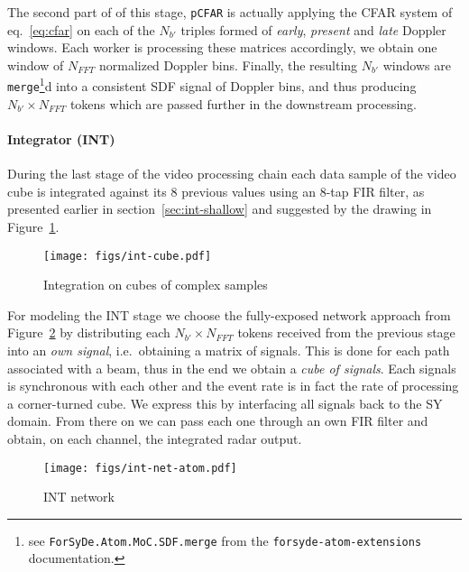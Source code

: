 \documentclass[
  a4paper,
]{article}
\let\oldparagraph\paragraph
\renewcommand{\paragraph}[1]{\oldparagraph{#1}\mbox{}}
\begin{document}
The second part of of this stage, \texttt{pCFAR} is actually applying
the CFAR system of eq.~\ref{eq:cfar} on each of the \(N_{b'}\) triples
formed of \emph{early}, \emph{present} and \emph{late} Doppler windows.
Each worker is processing these matrices accordingly, we obtain one
window of \(N_{FFT}\) normalized Doppler bins. Finally, the resulting
\(N_{b'}\) windows are \texttt{merge}\footnote{see
  \texttt{ForSyDe.Atom.MoC.SDF.merge} from the
  \texttt{forsyde-atom-extensions} documentation.}d into a consistent
SDF signal of Doppler bins, and thus producing \(N_{b'}\times N_{FFT}\)
tokens which are passed further in the downstream processing.

\hypertarget{integrator-int}{%
\paragraph{Integrator (INT)}\label{integrator-int}}

During the last stage of the video processing chain each data sample of
the video cube is integrated against its 8 previous values using an
8-tap FIR filter, as presented earlier in section~\ref{sec:int-shallow}
and suggested by the drawing in Figure~\ref{fig:int-cube-atom}.

\begin{figure}
\hypertarget{fig:int-cube-atom}{%
\centering
\texttt{[image: figs/int-cube.pdf]}
\caption{Integration on cubes of complex
samples}\label{fig:int-cube-atom}
}
\end{figure}

For modeling the INT stage we choose the fully-exposed network approach
from Figure~\ref{fig:int-net-atom} by distributing each
\(N_{b'}\times N_{FFT}\) tokens received from the previous stage into an
\emph{own signal}, i.e.~obtaining a matrix of signals. This is done for
each path associated with a beam, thus in the end we obtain a \emph{cube
of signals}. Each signals is synchronous with each other and the event
rate is in fact the rate of processing a corner-turned cube. We express
this by interfacing all signals back to the SY domain. From there on we
can pass each one through an own FIR filter and obtain, on each channel,
the integrated radar output.

\begin{figure}
\hypertarget{fig:int-net-atom}{%
\centering
\texttt{[image: figs/int-net-atom.pdf]}
\caption{INT network}\label{fig:int-net-atom}
}
\end{figure}
\end{document}
